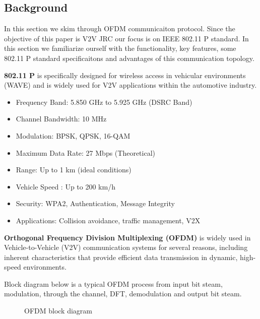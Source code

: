 \documentclass[conference]{IEEEtran}
\begin{document}
	 \subsection {Background}
 
 
            In this section we skim through OFDM communicaiton protocol. Since the objective of this paper is V2V JRC our focus is on IEEE 802.11 P standard. In this section we familiarize ourself with the functionality, key features, some 802.11 P standard specificaitons and advantages of this communication topology.\par
    \textbf{  802.11 P} is specifically designed for wireless access in vehicular environments (WAVE) and is widely used for V2V applications within the automotive industry.
      
      \begin{itemize}
      \item Frequency Band:		5.850 GHz to 5.925 GHz (DSRC Band)
	\item Channel Bandwidth:	10 MHz
	\item Modulation:		BPSK, QPSK, 16-QAM
	\item Maximum Data Rate:	27 Mbps (Theoretical)
	\item Range: 			Up to 1 km (ideal conditions)
	\item Vehicle Speed :                Up to 200 km/h
	\item Security:			WPA2, Authentication, Message Integrity
	\item Applications:		Collision avoidance, traffic management, V2X
	\end{itemize}
	
 \textbf{ Orthogonal Frequency Division Multiplexing (OFDM)} is widely used in Vehicle-to-Vehicle (V2V) communication systems for several reasons, including inherent characteristics that provide efficient data transmission in dynamic, high-speed environments.

Block diagram below is a typical OFDM process from input bit steam, modulation, through the channel, DFT, demodulation and output bit steam. 

		\begin{figure}[H]
	    		\centering
	    		\caption{OFDM block diagram}
		\end{figure}
      
\end{document}
